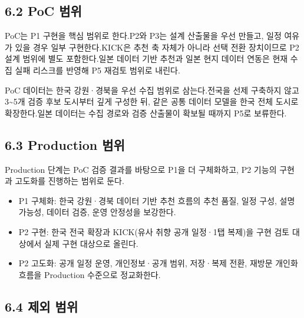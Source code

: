 \documentclass[12pt,a4paper]{article}
\newcommand{\DocNeedspace}[1]{\par\ifdim\dimexpr\pagegoal-\pagetotal\relax<#1\newpage\fi}
\begin{document}
\DocNeedspace{24\baselineskip}
\subsection*{6.2 PoC 범위}


\DocNeedspace{3\baselineskip}
PoC는 P1 구현을 핵심 범위로 한다.\newline P2와 P3는 설계 산출물을 우선 만들고, 일정 여유가 있을 경우 일부 구현한다.\newline KICK은 추천 축 자체가 아니라 선택 전환 장치이므로 P2 설계 범위에 별도 포함한다.\newline 일본 데이터 기반 추천과 일본 현지 데이터 연동은 현재 수집 실패 리스크를 반영해 P5 재검토 범위로 내린다.


\DocNeedspace{3\baselineskip}
PoC 데이터는 한국 강원·경북을 우선 수집 범위로 삼는다.\newline 전국을 선제 구축하지 않고 3\textasciitilde{}5개 검증 후보 도시부터 깊게 구성한 뒤, 같은 공통 데이터 모델을 한국 전체 도시로 확장한다.\newline 일본 데이터는 수집 경로와 검증 산출물이 확보될 때까지 P5로 보류한다.


\DocNeedspace{24\baselineskip}
\subsection*{6.3 Production 범위}


\DocNeedspace{3\baselineskip}
Production 단계는 PoC 검증 결과를 바탕으로 P1을 더 구체화하고, P2 기능의 구현과 고도화를 진행하는 범위로 둔다.


\begin{itemize}
\item P1 구체화: 한국 강원·경북 데이터 기반 추천 흐름의 추천 품질, 일정 구성, 설명 가능성, 데이터 검증, 운영 안정성을 보강한다.
\item P2 구현: 한국 전국 확장과 KICK(유사 취향 공개 일정·1탭 복제)을 구현 검토 대상에서 실제 구현 대상으로 올린다.
\item P2 고도화: 공개 일정 운영, 개인정보·공개 범위, 저장·복제 전환, 재방문 개인화 흐름을 Production 수준으로 정교화한다.
\end{itemize}


\DocNeedspace{24\baselineskip}
\subsection*{6.4 제외 범위}
\end{document}
